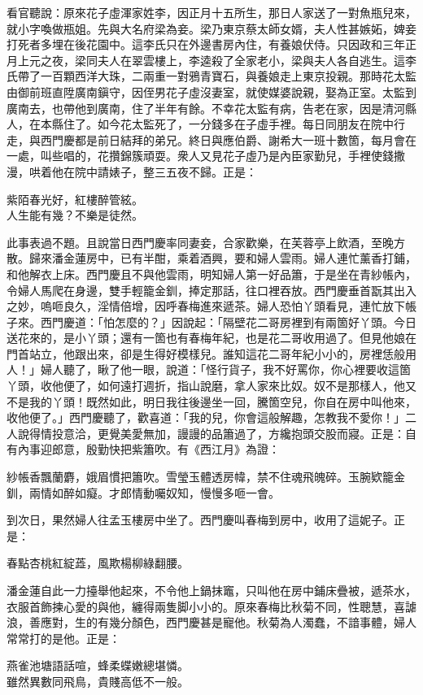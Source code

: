 看官聽說：原來花子虛渾家姓李，因正月十五所生，那日人家送了一對魚瓶兒來，就小字喚做瓶姐。先與大名府梁為妾。梁乃東京蔡太師女婿，夫人性甚嫉妬，婢妾打死者多埋在後花園中。這李氏只在外邊書房內住，有養娘伏侍。只因政和三年正月上元之夜，梁同夫人在翠雲樓上，李逵殺了全家老小，{}梁與夫人各自逃生。這李氏帶了一百顆西洋大珠，{}二兩重一對鴉青寶石，與養娘走上東京投親。那時花太監由御前班直陞廣南鎭守，因侄男花子虛沒妻室，就使媒婆說親，娶為正室。太監到廣南去，也帶他到廣南，住了半年有餘。不幸花太監有病，告老在家，因是清河縣人，在本縣住了。如今花太監死了，一分錢多在子虛手裡。每日同朋友在院中行走，與西門慶都是前日結拜的弟兄。終日與應伯爵、謝希大一班十數箇，每月會在一處，叫些唱的，花攢錦簇頑耍。衆人又見花子虛乃是內臣家勤兒，手裡使錢撒漫，哄着他在院中請婊子，整三五夜不歸。正是：

\begin{myquote}
紫陌春光好，紅樓醉管絃。\\人生能有幾？不樂是徒然。
\end{myquote}

此事表過不題。且說當日西門慶率同妻妾，合家歡樂，在芙蓉亭上飲酒，至晚方散。歸來潘金蓮房中，已有半酣，乘着酒興，要和婦人雲雨。婦人連忙薰香打鋪，和他解衣上床。西門慶且不與他雲雨，明知婦人第一好品簫，于是坐在青紗帳內，令婦人馬爬在身邊，雙手輕籠金釧，捧定那話，往口裡吞放。西門慶垂首翫其出入之妙，嗚咂良久，淫情倍增，因呼春梅進來遞茶。{}婦人恐怕丫頭看見，連忙放下帳子來。西門慶道：「怕怎麼的？」因說起：「隔壁花二哥房裡到有兩箇好丫頭。今日送花來的，是小丫頭；還有一箇也有春梅年紀，也是花二哥收用過了。但見他娘在門首站立，{}他跟出來，卻是生得好模樣兒。誰知這花二哥年紀小小的，房裡恁般用人！」{}婦人聽了，瞅了他一眼，說道：「怪行貨子，我不好罵你，你心裡要收這箇丫頭，{}收他便了，如何遠打週折，指山說磨，拿人家來比奴。奴不是那樣人，他又不是我的丫頭！既然如此，明日我往後邊坐一回，騰箇空兒，你自在房中叫他來，收他便了。」{}西門慶聽了，歡喜道：「我的兒，你會這般解趣，怎教我不愛你！」二人說得情投意洽，更覺美愛無加，謾謾的品簫過了，方纔抱頭交股而寢。正是：自有內事迎郎意，殷勤快把紫簫吹。有《西江月》為證：

\begin{myquote}
紗帳香飄蘭麝，娥眉慣把簫吹。雪瑩玉體透房幃，禁不住魂飛魄碎。玉腕欵籠金釧，兩情如醉如癡。才郎情動囑奴知，慢慢多咂一會。
\end{myquote}

到次日，果然婦人往孟玉樓房中坐了。西門慶叫春梅到房中，收用了這妮子。正是：

\begin{myquote}
春點杏桃紅綻蕋，風欺楊柳綠翻腰。
\end{myquote}

潘金蓮自此一力擡舉他起來，不令他上鍋抹竈，只叫他在房中鋪床疊被，遞茶水，衣服首飾揀心愛的與他，纏得兩隻脚小小的。原來春梅比秋菊不同，性聰慧，喜謔浪，善應對，生的有幾分顏色，西門慶甚是寵他。秋菊為人濁蠢，不諳事體，婦人常常打的是他。正是：

\begin{myquote}
燕雀池塘語話喧，蜂柔蝶嫩總堪憐。\\雖然異數同飛鳥，貴賤高低不一般。
\end{myquote}

